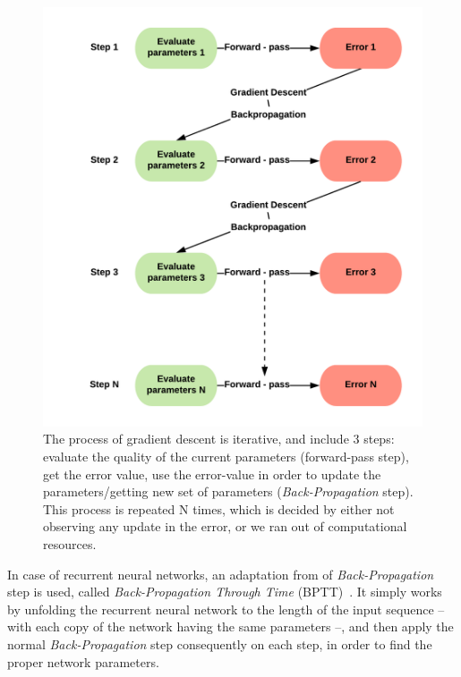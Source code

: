 \begin{figure}
    \centering
    \includegraphics{images/gbem/gradient_descent_informal.png}
    \caption{The process of gradient descent is iterative, and include 3 steps: evaluate the quality of the current parameters (forward-pass step), get the error value, use the error-value in order to update the parameters/getting new set of parameters (\textit{Back-Propagation} step). This process is repeated N times, which is decided by either not observing any update in the error, or we ran out of computational resources.}
    \label{fig:grad_descent_inuitive}
\end{figure}

\par In case of recurrent neural networks, an adaptation from of \textit{Back-Propagation} step is used, called \textit{Back-Propagation Through Time} (BPTT)~\citep{werbos1988generalization,robinson:utility,mozer1995focused}. It simply works by unfolding the recurrent neural network to the length of the input sequence -- with each copy of the network having the same parameters --, and then apply the normal \textit{Back-Propagation} step consequently on each step, in order to find the proper network parameters.

